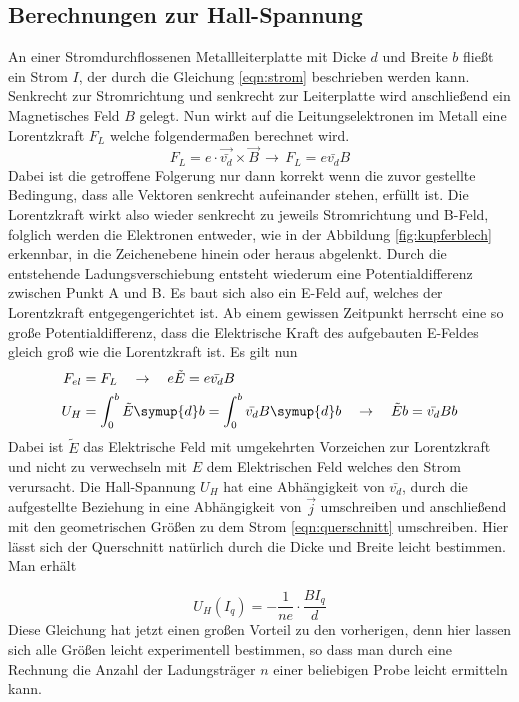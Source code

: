 \subsection{Berechnungen zur Hall-Spannung}
An einer Stromdurchflossenen Metallleiterplatte mit Dicke $d$ und Breite $b$ fließt ein Strom $I$, der durch die Gleichung \eqref{eqn:strom} beschrieben werden kann. Senkrecht
zur Stromrichtung und senkrecht zur Leiterplatte wird anschließend ein Magnetisches Feld $B$ gelegt. Nun wirkt auf die Leitungselektronen im Metall eine Lorentzkraft $F_{L}$ welche folgendermaßen berechnet wird.
\begin{equation}
\label{eqn:lorentz}
F_{L} =  e \cdot \vec{\bar{v_{d}}} \times \vec{B} \, \to \, F_{L} = e \bar{v_{d}} B
\end{equation}
Dabei ist die getroffene Folgerung nur dann korrekt wenn die zuvor gestellte Bedingung, dass alle Vektoren senkrecht aufeinander stehen, erfüllt ist.
Die Lorentzkraft wirkt also wieder senkrecht zu jeweils Stromrichtung und B-Feld, folglich werden die Elektronen entweder, wie in der Abbildung \ref{fig:kupferblech} erkennbar, in die Zeichenebene hinein oder heraus
abgelenkt. Durch die entstehende Ladungsverschiebung entsteht wiederum eine Potentialdifferenz zwischen Punkt A und B. Es baut sich also ein E-Feld auf, welches der Lorentzkraft entgegengerichtet ist.
Ab einem gewissen Zeitpunkt herrscht eine so große Potentialdifferenz, dass die Elektrische Kraft des aufgebauten E-Feldes gleich groß wie die Lorentzkraft ist.
Es gilt nun
\begin{align*}
F_{el} &= F_{L} \quad \to \quad e \tilde{E} = e \bar{v_{d}} B \\
U_{H} &= \int_{0}^{b} \tilde{E} \symup{d}b = \int_{0}^{b} \bar{v_{d}} B \symup{d}b \quad \to \quad \tilde{E} b = \bar{v_{d}} B b
\end{align*}
Dabei ist $\tilde{E}$ das Elektrische Feld mit umgekehrten Vorzeichen zur Lorentzkraft und nicht zu verwechseln mit $E$ dem Elektrischen Feld welches den Strom verursacht.
Die Hall-Spannung $U_{H}$ hat eine Abhängigkeit von $\bar{v_{d}}$, durch die aufgestellte Beziehung \label{eqn:stromdichteunddrift} in eine Abhängigkeit von $\vec{j}$ umschreiben und 
anschließend mit den geometrischen Größen zu dem Strom \eqref{eqn:querschnitt} umschreiben. Hier lässt sich der Querschnitt natürlich durch die Dicke und Breite leicht bestimmen. Man erhält

\begin{equation}
\label{eqn:hallspannungfuern}
U_{H}(I_{q}) = - \frac{1}{n e} \cdot \frac{B I_{q}}{d}
\end{equation}
Diese Gleichung hat jetzt einen großen Vorteil zu den vorherigen, denn hier lassen sich alle Größen leicht experimentell bestimmen, so dass man 
durch eine Rechnung die Anzahl der Ladungsträger $n$ einer beliebigen Probe leicht ermitteln kann.

